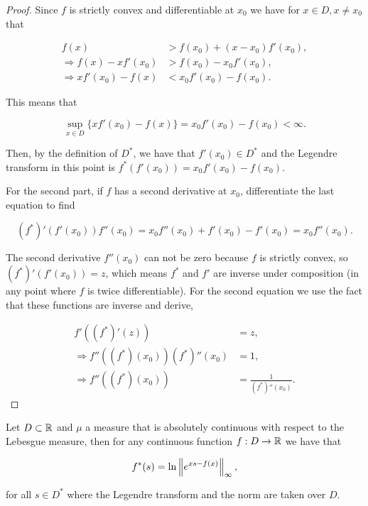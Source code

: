 \begin{proof}
    Since $f$ is strictly convex and differentiable at $x_0$ we have for $x\in D, x\neq x_0$ that 
    
    \begin{align*}
        f(x) &> f(x_0) + (x-x_0)f'(x_0), \\
        \Rightarrow f(x) -xf'(x_0) &> f(x_0) - x_0 f'(x_0),\\
        \Rightarrow xf'(x_0) - f(x) &< x_0 f'(x_0) - f(x_0).
    \end{align*}

    This means that 

    \begin{equation*}
        \sup_{x\in D}\{ xf'(x_0) - f(x) \} = x_0f'(x_0) - f(x_0) < \infty.
    \end{equation*}

    Then, by the definition of $D^*$, we have that $f'(x_0) \in D^*$ and the Legendre transform in this point is $f^*(f'(x_0)) = x_0f'(x_0) - f(x_0)$.

    For the second part, if $f$ has a second derivative at $x_0$, differentiate the last equation to find

    \begin{equation*}
        (f^*)'(f'(x_0))f''(x_0) = x_0 f''(x_0) + f'(x_0) - f'(x_0) = x_0 f''(x_0). 
    \end{equation*}

    The second derivative $f''(x_0)$ can not be zero because $f$ is strictly convex, so $(f^*)'(f'(x_0)) = z$, which means $f^*$ and $f'$ are inverse under composition (in any point where $f$ is twice differentiable). For the second equation we use the fact that these functions are inverse and derive,

    \begin{align*}
        f'((f^*)'(z)) &= z,\\
        \Rightarrow f''((f^*)(x_0))(f^*)''(x_0) &= 1,\\
        \Rightarrow f''((f^*)(x_0)) &= \frac1{(f^*)''(x_0)}.
    \end{align*}
\end{proof}

\begin{lemma} \label{lemma:legendre_transform_norm}
    Let $D \subset \mathbb R$ and $\mu$ a measure that is absolutely continuous with respect to the Lebesgue measure, then for any continuous function $f: D \to \mathbb R$ we have that

    \begin{equation*}
        f^*(s) = \ln \left\lVert e^{xs - f(x)} \right\rVert_{\infty},
    \end{equation*}

    \noindent for all $s \in D^*$ where the Legendre transform and the norm are taken over $D$.
\end{lemma}

